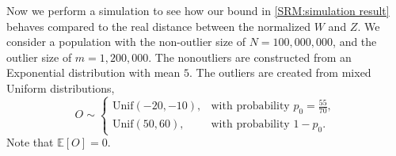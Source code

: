 \documentclass[pdflatex,sn-mathphys-ay]{sn-jnl}
\newcommand{\E}{\mathbb{E}}
\newtheorem{corollary}[theorem]{Corollary}
\theoremstyle{thmstyleone}%
\theoremstyle{thmstyletwo}%
\theoremstyle{thmstylethree}%
\begin{document}

Now we perform a simulation to see how our bound in \eqref{SRM:simulation result} behaves compared to the real distance between the normalized $W$ and $Z$. We consider a population with the non-outlier size of \(N = 100{,}000{,}000\), and the outlier size of \(m = 1{,}200{,}000\). The nonoutliers are constructed from an Exponential distribution with mean $5$. The outliers are created from mixed Uniform distributions,
\[
O \sim 
\begin{cases}
	\mathrm{Unif}(-20,-10), & \text{with probability } p_0=\frac{55}{70},\\[0.4em]
	\mathrm{Unif}(50,60), & \text{with probability } 1-p_0.
\end{cases}
\]
Note that $\mathbb{E}[O]=0$.
\end{document}
